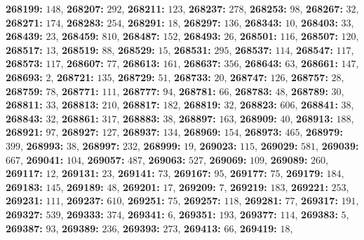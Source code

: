 \textsf{\bfseries 268199:} $148$, \textsf{\bfseries 268207:} $292$, \textsf{\bfseries 268211:} $123$, \textsf{\bfseries 268237:} $278$, \textsf{\bfseries 268253:} $98$, \textsf{\bfseries 268267:} $32$, \textsf{\bfseries 268271:} $174$, \textsf{\bfseries 268283:} $254$, \textsf{\bfseries 268291:} $18$, \textsf{\bfseries 268297:} $136$, \textsf{\bfseries 268343:} $10$, \textsf{\bfseries 268403:} $33$, \textsf{\bfseries 268439:} $23$, \textsf{\bfseries 268459:} $810$, \textsf{\bfseries 268487:} $152$, \textsf{\bfseries 268493:} $26$, \textsf{\bfseries 268501:} $116$, \textsf{\bfseries 268507:} $120$, \textsf{\bfseries 268517:} $13$, \textsf{\bfseries 268519:} $88$, \textsf{\bfseries 268529:} $15$, \textsf{\bfseries 268531:} $295$, \textsf{\bfseries 268537:} $114$, \textsf{\bfseries 268547:} $117$, \textsf{\bfseries 268573:} $117$, \textsf{\bfseries 268607:} $77$, \textsf{\bfseries 268613:} $161$, \textsf{\bfseries 268637:} $356$, \textsf{\bfseries 268643:} $63$, \textsf{\bfseries 268661:} $147$, \textsf{\bfseries 268693:} $2$, \textsf{\bfseries 268721:} $135$, \textsf{\bfseries 268729:} $51$, \textsf{\bfseries 268733:} $20$, \textsf{\bfseries 268747:} $126$, \textsf{\bfseries 268757:} $28$, \textsf{\bfseries 268759:} $78$, \textsf{\bfseries 268771:} $111$, \textsf{\bfseries 268777:} $94$, \textsf{\bfseries 268781:} $66$, \textsf{\bfseries 268783:} $48$, \textsf{\bfseries 268789:} $30$, \textsf{\bfseries 268811:} $33$, \textsf{\bfseries 268813:} $210$, \textsf{\bfseries 268817:} $182$, \textsf{\bfseries 268819:} $32$, \textsf{\bfseries 268823:} $606$, \textsf{\bfseries 268841:} $38$, \textsf{\bfseries 268843:} $32$, \textsf{\bfseries 268861:} $317$, \textsf{\bfseries 268883:} $38$, \textsf{\bfseries 268897:} $163$, \textsf{\bfseries 268909:} $40$, \textsf{\bfseries 268913:} $188$, \textsf{\bfseries 268921:} $97$, \textsf{\bfseries 268927:} $127$, \textsf{\bfseries 268937:} $134$, \textsf{\bfseries 268969:} $154$, \textsf{\bfseries 268973:} $465$, \textsf{\bfseries 268979:} $399$, \textsf{\bfseries 268993:} $38$, \textsf{\bfseries 268997:} $232$, \textsf{\bfseries 268999:} $19$, \textsf{\bfseries 269023:} $115$, \textsf{\bfseries 269029:} $581$, \textsf{\bfseries 269039:} $667$, \textsf{\bfseries 269041:} $104$, \textsf{\bfseries 269057:} $487$, \textsf{\bfseries 269063:} $527$, \textsf{\bfseries 269069:} $109$, \textsf{\bfseries 269089:} $260$, \textsf{\bfseries 269117:} $12$, \textsf{\bfseries 269131:} $23$, \textsf{\bfseries 269141:} $73$, \textsf{\bfseries 269167:} $95$, \textsf{\bfseries 269177:} $75$, \textsf{\bfseries 269179:} $184$, \textsf{\bfseries 269183:} $145$, \textsf{\bfseries 269189:} $48$, \textsf{\bfseries 269201:} $17$, \textsf{\bfseries 269209:} $7$, \textsf{\bfseries 269219:} $183$, \textsf{\bfseries 269221:} $253$, \textsf{\bfseries 269231:} $111$, \textsf{\bfseries 269237:} $610$, \textsf{\bfseries 269251:} $75$, \textsf{\bfseries 269257:} $118$, \textsf{\bfseries 269281:} $77$, \textsf{\bfseries 269317:} $191$, \textsf{\bfseries 269327:} $539$, \textsf{\bfseries 269333:} $374$, \textsf{\bfseries 269341:} $6$, \textsf{\bfseries 269351:} $193$, \textsf{\bfseries 269377:} $114$, \textsf{\bfseries 269383:} $5$, \textsf{\bfseries 269387:} $93$, \textsf{\bfseries 269389:} $236$, \textsf{\bfseries 269393:} $273$, \textsf{\bfseries 269413:} $66$, \textsf{\bfseries 269419:} $18$, 
